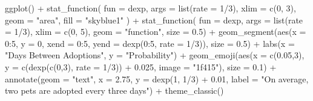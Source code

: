 \documentclass[
]{article}
\newenvironment{Shaded}{\begin{snugshade}}{\end{snugshade}}
\newcommand{\AttributeTok}[1]{\textcolor[rgb]{0.77,0.63,0.00}{#1}}
\newcommand{\DecValTok}[1]{\textcolor[rgb]{0.00,0.00,0.81}{#1}}
\newcommand{\FloatTok}[1]{\textcolor[rgb]{0.00,0.00,0.81}{#1}}
\newcommand{\FunctionTok}[1]{\textcolor[rgb]{0.00,0.00,0.00}{#1}}
\newcommand{\NormalTok}[1]{#1}
\newcommand{\SpecialCharTok}[1]{\textcolor[rgb]{0.00,0.00,0.00}{#1}}
\newcommand{\StringTok}[1]{\textcolor[rgb]{0.31,0.60,0.02}{#1}}
\begin{document}
\begin{Shaded}
\begin{Highlighting}[]
\FunctionTok{ggplot}\NormalTok{() }\SpecialCharTok{+}
  \FunctionTok{stat\_function}\NormalTok{(}
    \AttributeTok{fun =}\NormalTok{ dexp,}
    \AttributeTok{args =} \FunctionTok{list}\NormalTok{(}\AttributeTok{rate =} \DecValTok{1}\SpecialCharTok{/}\DecValTok{3}\NormalTok{),}
    \AttributeTok{xlim =} \FunctionTok{c}\NormalTok{(}\DecValTok{0}\NormalTok{, }\DecValTok{3}\NormalTok{),}
    \AttributeTok{geom =} \StringTok{"area"}\NormalTok{,}
    \AttributeTok{fill =} \StringTok{"skyblue1"}
\NormalTok{  ) }\SpecialCharTok{+}
  \FunctionTok{stat\_function}\NormalTok{(}
    \AttributeTok{fun =}\NormalTok{ dexp,}
    \AttributeTok{args =} \FunctionTok{list}\NormalTok{(}\AttributeTok{rate =} \DecValTok{1}\SpecialCharTok{/}\DecValTok{3}\NormalTok{), }
    \AttributeTok{xlim =} \FunctionTok{c}\NormalTok{(}\DecValTok{0}\NormalTok{, }\DecValTok{5}\NormalTok{),}
    \AttributeTok{geom =} \StringTok{"function"}\NormalTok{,}
    \AttributeTok{size =} \FloatTok{0.5}\NormalTok{) }\SpecialCharTok{+}
  \FunctionTok{geom\_segment}\NormalTok{(}\FunctionTok{aes}\NormalTok{(}\AttributeTok{x =} \DecValTok{0}\SpecialCharTok{:}\DecValTok{5}\NormalTok{, }\AttributeTok{y =} \DecValTok{0}\NormalTok{, }\AttributeTok{xend =} \DecValTok{0}\SpecialCharTok{:}\DecValTok{5}\NormalTok{, }\AttributeTok{yend =} \FunctionTok{dexp}\NormalTok{(}\DecValTok{0}\SpecialCharTok{:}\DecValTok{5}\NormalTok{, }\AttributeTok{rate =} \DecValTok{1}\SpecialCharTok{/}\DecValTok{3}\NormalTok{)), }\AttributeTok{size =} \FloatTok{0.5}\NormalTok{) }\SpecialCharTok{+}
  \FunctionTok{labs}\NormalTok{(}\AttributeTok{x =} \StringTok{"Days Between Adoptions"}\NormalTok{, }\AttributeTok{y =} \StringTok{"Probability"}\NormalTok{) }\SpecialCharTok{+}
  \FunctionTok{geom\_emoji}\NormalTok{(}\FunctionTok{aes}\NormalTok{(}\AttributeTok{x =} \FunctionTok{c}\NormalTok{(}\FloatTok{0.05}\NormalTok{,}\DecValTok{3}\NormalTok{), }\AttributeTok{y =} \FunctionTok{c}\NormalTok{(}\FunctionTok{dexp}\NormalTok{(}\FunctionTok{c}\NormalTok{(}\DecValTok{0}\NormalTok{,}\DecValTok{3}\NormalTok{), }\AttributeTok{rate =} \DecValTok{1}\SpecialCharTok{/}\DecValTok{3}\NormalTok{)) }\SpecialCharTok{+} \FloatTok{0.025}\NormalTok{, }\AttributeTok{image =} \StringTok{"1f415"}\NormalTok{), }\AttributeTok{size =} \FloatTok{0.1}\NormalTok{) }\SpecialCharTok{+}
  \FunctionTok{annotate}\NormalTok{(}\AttributeTok{geom =} \StringTok{"text"}\NormalTok{, }\AttributeTok{x =} \FloatTok{2.75}\NormalTok{, }\AttributeTok{y =} \FunctionTok{dexp}\NormalTok{(}\DecValTok{1}\NormalTok{, }\DecValTok{1}\SpecialCharTok{/}\DecValTok{3}\NormalTok{) }\SpecialCharTok{+} \FloatTok{0.01}\NormalTok{, }
           \AttributeTok{label =} \StringTok{"On average, two pets are adopted every three days"}\NormalTok{) }\SpecialCharTok{+}
  \FunctionTok{theme\_classic}\NormalTok{()}
\end{Highlighting}
\end{Shaded}
\end{document}
